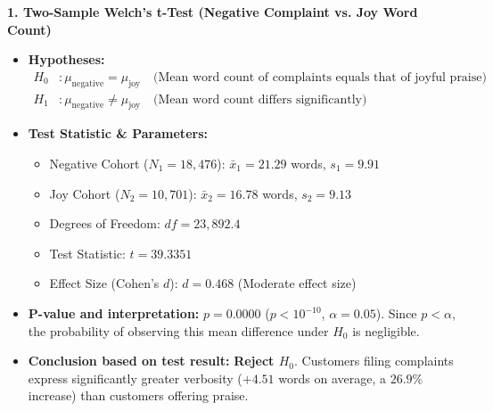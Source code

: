 \documentclass[12pt]{article}
\begin{document}
\noindent \textbf{1. Two-Sample Welch's t-Test (Negative Complaint vs. Joy Word Count)}
\begin{itemize}[leftmargin=1.5em]
    \item \textbf{Hypotheses:}
    \begin{align*}
        H_0 &: \mu_{\text{negative}} = \mu_{\text{joy}} \quad \text{(Mean word count of complaints equals that of joyful praise)} \\
        H_1 &: \mu_{\text{negative}} \neq \mu_{\text{joy}} \quad \text{(Mean word count differs significantly)}
    \end{align*}
    \item \textbf{Test Statistic \& Parameters:}
    \begin{itemize}
        \item Negative Cohort ($N_1 = 18,476$): $\bar{x}_1 = 21.29$ words, $s_1 = 9.91$
        \item Joy Cohort ($N_2 = 10,701$): $\bar{x}_2 = 16.78$ words, $s_2 = 9.13$
        \item Degrees of Freedom: $df = 23,892.4$
        \item Test Statistic: $t = 39.3351$
        \item Effect Size (Cohen's $d$): $d = 0.468$ (Moderate effect size)
    \end{itemize}
    \item \textbf{P-value and interpretation:} $p = 0.0000$ ($p < 10^{-10}$, $\alpha = 0.05$). Since $p < \alpha$, the probability of observing this mean difference under $H_0$ is negligible.
    \item \textbf{Conclusion based on test result:} \textbf{Reject $H_0$}. Customers filing complaints express significantly greater verbosity ($+4.51$ words on average, a $26.9\%$ increase) than customers offering praise.
\end{itemize}

\vspace{0.6em}
\end{document}
